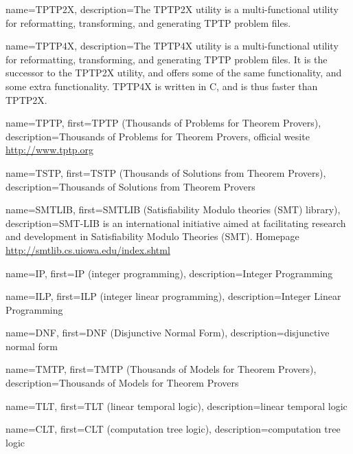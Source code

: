  {
    name=TPTP2X,
    description={The TPTP2X utility is a multi-functional utility for reformatting, transforming, and generating TPTP problem files.}
}

 {
    name=TPTP4X,
    description={The TPTP4X utility is a multi-functional utility for reformatting, transforming, and generating TPTP problem files. It is the successor to the TPTP2X utility, and offers some of the same functionality, and some extra functionality. TPTP4X is written in C, and is thus faster than TPTP2X.}
}

 {
    name=TPTP,
    first={TPTP (Thousands of Problems for Theorem Provers)},
    description={Thousands of Problems for Theorem Provers, official wesite \url{http://www.tptp.org}}
}

 {
    name=TSTP,
    first={TSTP (Thousands of Solutions from Theorem Provers)},
    description={Thousands of Solutions from Theorem Provers}
}

 {
    name=SMTLIB,
    first={SMTLIB (Satisfiability Modulo theories (SMT) library)},
    description={SMT-LIB is an international initiative aimed at facilitating research and development in Satisfiability Modulo Theories (SMT). Homepage \url{http://smtlib.cs.uiowa.edu/index.shtml}}
}

 {
    name=IP,
    first={IP (integer programming)},
    description={Integer Programming}
}

 {
    name=ILP,
    first={ILP (integer linear programming)},
    description={Integer Linear Programming}
}

 {
    name=DNF,
    first={DNF (Disjunctive Normal Form)},
    description={disjunctive normal form}
}

 {
    name=TMTP,
    first={TMTP (Thousands of Models for Theorem Provers)},
    description={Thousands of Models for Theorem Provers}
}

 {
    name=TLT,
    first={TLT (linear temporal logic)},
    description={linear temporal logic}
}

 {
    name=CLT,
    first={CLT (computation tree logic)},
    description={computation tree logic}
}
